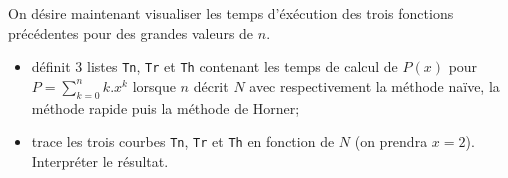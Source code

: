
On désire maintenant visualiser les temps d'éxécution des trois fonctions précédentes pour des grandes valeurs de $n$.

\begin{itemize}
\item définit 3 listes \texttt{Tn}, \texttt{Tr} et \texttt{Th} contenant les temps de calcul de $P(x)$ pour $P=\displaystyle\sum_{k=0}^n k.x^k$ lorsque $n$ décrit $N$ avec respectivement la méthode naïve, la méthode rapide puis la méthode de Horner;
\item trace les trois courbes  \texttt{Tn}, \texttt{Tr} et \texttt{Th} en fonction de $N$ (on prendra $x=2$). Interpréter le résultat.
\end{itemize}

